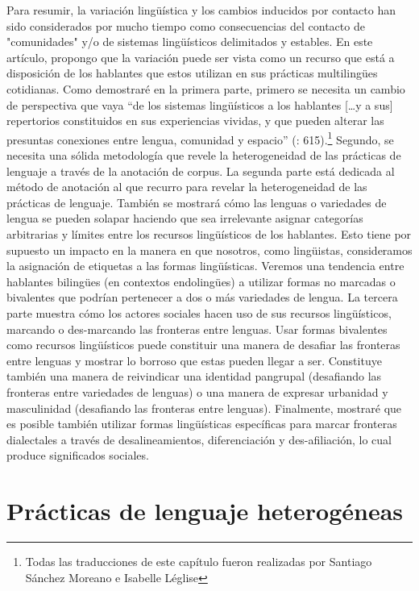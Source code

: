 \documentclass[output=paper]{langscibook}
\begin{document}
Para resumir, la variación lingüística y los cambios inducidos por contacto han sido considerados por mucho tiempo como consecuencias del contacto de "comunidades" y/o de sistemas lingüísticos delimitados y estables. En este artículo, propongo que la variación puede ser vista como un recurso que está a disposición de los hablantes que estos utilizan en sus prácticas multilingües cotidianas. Como demostraré en la primera parte, primero se necesita un cambio de perspectiva que vaya “de los sistemas lingüísticos a los hablantes […y a sus] repertorios constituidos en sus experiencias vividas, y que pueden alterar las presuntas conexiones entre lengua, comunidad y espacio” (\citealt{HallNilep2015}: 615).\footnote {Todas las traducciones de este capítulo fueron realizadas por Santiago Sánchez Moreano e Isabelle Léglise} Segundo, se necesita una sólida metodología que revele la heterogeneidad de las prácticas de lenguaje a través de la anotación de corpus. La segunda parte está dedicada al método de anotación al que recurro para revelar la heterogeneidad de las prácticas de lenguaje. También se mostrará cómo las lenguas o variedades de lengua se pueden solapar haciendo que sea irrelevante asignar categorías arbitrarias y límites entre los recursos lingüísticos de los hablantes. Esto tiene por supuesto un impacto en la manera en que nosotros, como lingüistas, consideramos la asignación de etiquetas a las formas lingüísticas. Veremos una tendencia entre hablantes bilingües (en contextos endolingües) a utilizar formas no marcadas o bivalentes \citep{Woolard1998} que podrían pertenecer a dos o más variedades de lengua. La tercera parte muestra cómo los actores sociales hacen uso de sus recursos lingüísticos, marcando o des-marcando las fronteras entre lenguas. Usar formas bivalentes como recursos lingüísticos puede constituir una manera de desafiar las fronteras entre lenguas y mostrar lo borroso que estas pueden llegar a ser. Constituye también una manera de reivindicar una identidad pangrupal (desafiando las fronteras entre variedades de lenguas) o una manera de expresar urbanidad y masculinidad (desafiando las fronteras entre lenguas). Finalmente, mostraré que es posible también utilizar formas lingüísticas específicas para marcar fronteras dialectales a través de desalineamientos, diferenciación y des-afiliación, lo cual produce significados sociales.
 \section{Prácticas de lenguaje heterogéneas}
\end{document}
